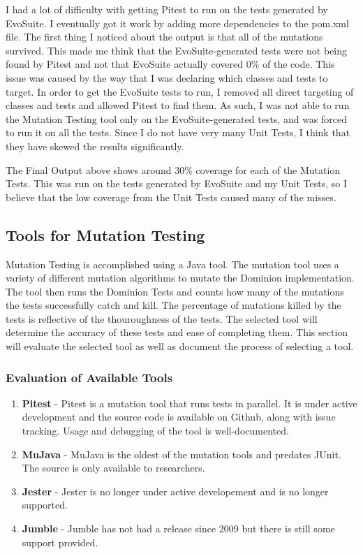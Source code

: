 \documentclass[letterpaper,10pt]{article}
\begin{document}
		I had a lot of difficulty with getting Pitest to run on the tests generated by 
		EvoSuite. I eventually got it work by adding more dependencies to the pom.xml file. 
		The first thing I noticed about the output is that all of the mutations survived. 
		This made me think that the EvoSuite-generated tests were not being found by Pitest
		and not that EvoSuite actually covered 0\% of the code. This issue was caused by the 
		way that I was declaring which classes and tests to target. In order to get the 
		EvoSuite tests to run, I removed all direct targeting of classes and tests and allowed
		 Pitest to find them. As such, I was not able to run the Mutation Testing tool only on
		 the EvoSuite-generated tests, and was forced to run it on all the tests. Since I do 
		not have very many Unit Tests, I think that they have skewed the results significantly.

		The Final Output above shows around 30\% coverage for each of the Mutation Tests. 
		This was run on the tests generated by EvoSuite and my Unit Tests, so I believe that 
		the low coverage from the Unit Tests caused many of the misses.
	\subsection{Tools for Mutation Testing}
	Mutation Testing is accomplished using a Java tool. The mutation tool uses a variety of 
	different mutation algorithms to mutate the Dominion implementation. The tool then runs the 
	Dominion Tests and counts how many of the mutations the tests successfully catch and kill. 
	The percentage of mutations killed by the tests is reflective of the thouroughness of the 
	tests. The selected tool will determine the accuracy of these tests and ease of completing 
	them. This section will evaluate the selected tool as well as document the process of 
	selecting a tool.
		\subsubsection{Evaluation of Available Tools}
		\begin{enumerate}
			\item{\textbf{Pitest} - Pitest is a mutation tool that runs tests in parallel.
				It is under active development and the source code is available on 
				Github, along with issue tracking. Usage and debugging of the tool is
				 well-documented.}
			\item{\textbf{MuJava} - MuJava is the oldest of the mutation tools and 
				predates JUnit. The source is only available to researchers.}
			\item{\textbf{Jester} - Jester is no longer under active developement and is 
				no longer supported.}
			\item{\textbf{Jumble} - Jumble has not had a release since 2009 but there is 
				still some support provided.}
		\end{enumerate}
\end{document}
